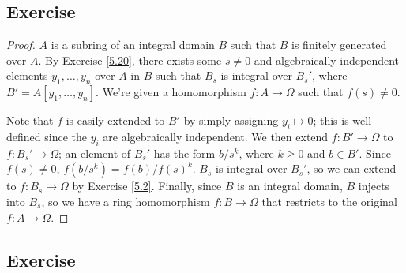 \subsection{Exercise}\label{5.21}

\begin{proof}
$A$ is a subring of an integral domain $B$ such that $B$ is finitely generated over $A$.
By Exercise \ref{5.20}, there exists some $s \neq 0$ and algebraically independent elements $y_1,\ldots,y_n$ over $A$ in $B$ such that
$B_s$ is integral over $B_s'$, where $B' = A[y_1,\ldots,y_n]$. We're given a homomorphism $f : A \to \Omega$ such that $f(s) \neq 0$.

Note that $f$ is easily extended to $B'$ by simply assigning $y_i \mapsto 0$; this is well-defined since the $y_i$ are algebraically independent. We
then extend $f : B' \to \Omega$ to $f : B_s' \to \Omega$; an element of $B_s'$ has the form $b / s^k$, where $k \ge 0$ and $b \in B'$.
Since $f(s) \neq 0$, $f(b / s^k) = f(b) / f(s)^k$. $B_s$ is integral over $B_s'$, so we can extend to $f : B_s \to \Omega$ by Exercise \ref{5.2}.
Finally, since $B$ is an integral domain, $B$ injects into $B_s$, so we have a ring homomorphism $f : B \to \Omega$ that restricts to the 
original $f : A \to \Omega$.
\end{proof}

\subsection{Exercise}\label{5.22}

